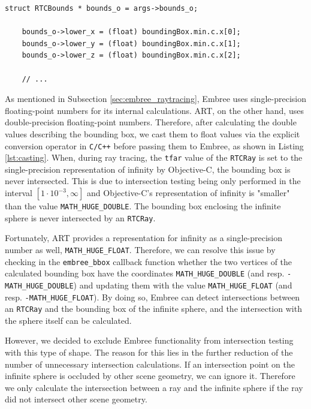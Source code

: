\begin{listing} 
	\begin{lstlisting}[caption={Casting of a double precision floating point number to a single precision floating point number by explicit conversion.}, label={lst:casting}]
	struct RTCBounds * bounds_o = args->bounds_o;
	
	bounds_o->lower_x = (float) boundingBox.min.c.x[0];
	bounds_o->lower_y = (float) boundingBox.min.c.x[1];
	bounds_o->lower_z = (float) boundingBox.min.c.x[2];
	
	// ...
	\end{lstlisting}
\end{listing}

As mentioned in Subsection \ref{sec:embree_raytracing}, Embree uses single-precision floating-point numbers for its internal calculations. ART, on the other hand, uses double-precision floating-point numbers. Therefore, after calculating the double values describing the bounding box, we cast them to float values via the explicit conversion operator in \texttt{C/C++} before passing them to Embree, as shown in Listing \ref{lst:casting}.  
When, during ray tracing, the \texttt{tfar} value of the \texttt{RTCRay} is set to the single-precision representation of infinity by Objective-C, the bounding box is never intersected. This is due to intersection testing being only performed in the interval $[1\cdot 10^{-3},\infty]$ and Objective-C's representation of infinity is "smaller" than the value \texttt{MATH\_HUGE\_DOUBLE}. The bounding box enclosing the infinite sphere is never intersected by an \texttt{RTCRay}.

Fortunately, ART provides a representation for infinity as a single-precision number as well, \texttt{MATH\_HUGE\_FLOAT}. Therefore, we can resolve this issue by checking in the \texttt{embree\_bbox} callback function whether the two vertices of the calculated bounding box have the coordinates \texttt{MATH\_HUGE\_DOUBLE} (and resp. \texttt{-MATH\_HUGE\_DOUBLE}) and updating them with the value \texttt{MATH\_HUGE\_FLOAT} (and resp. \texttt{-MATH\_HUGE\_FLOAT}). By doing so, Embree can detect intersections between an \texttt{RTCRay} and the bounding box of the infinite sphere, and the intersection with the sphere itself can be calculated.

However, we decided to exclude Embree functionality from intersection testing with this type of shape. The reason for this lies in the further reduction of the number of unnecessary intersection calculations. If an intersection point on the infinite sphere is occluded by other scene geometry, we can ignore it. Therefore we only calculate the intersection between a ray and the infinite sphere if the ray did not intersect other scene geometry.

